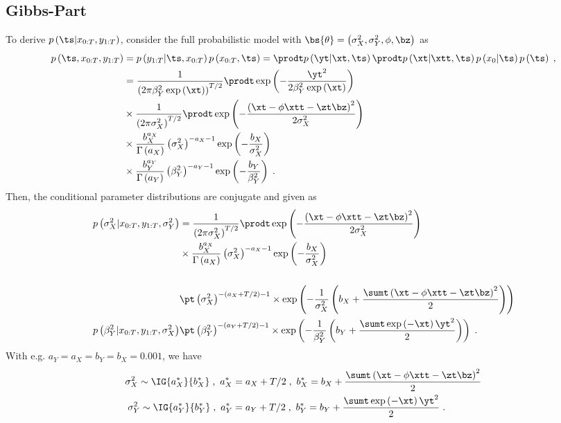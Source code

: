 \subsection{Gibbs-Part}
To derive $p\left(\ts|x_{0:T},y_{1:T}\right)$, consider the full probabilistic model with $\bs{\theta}=\left(\sigma_X^2,\sigma_Y^2,\phi,\bz\right)$ as
\begin{align*}
p\left(\ts,x_{0:T},y_{1:T}\right)
&=
p\left(y_{1:T}|\ts,x_{0:T}\right)p\left(x_{0:T},\ts\right)
=
\prodt p\left(\yt|\xt,\ts\right)
\prodt p\left(\xt|\xtt,\ts\right)p\left(x_0|\ts\right)p\left(\ts\right)\;,\\
&=
\frac{1}{\left(2\pi\beta_{Y}^2\exp\left(\xt\right)\right)^{T/2}}\prodt \exp \left(-\frac{\yt^2}{2\beta_{Y}^2\exp\left(\xt\right)}\right)\\
&\times
\frac{1}{\left(2\pi\sigma_{X}^2\right)^{T/2}}\prodt \exp \left(-\frac{\left(\xt-\phi\xtt-\zt\bz\right)^2}{2\sigma_X^2}\right)\\
&\times \frac{b_X^{a_X}}{\Gamma\left(a_X\right)}\left(\sigma_X^2\right)^{-a_X-1}\exp\left(-\frac{b_X}{\sigma_X^2}\right)\\
&\times \frac{b_Y^{a_Y}}{\Gamma\left(a_Y\right)}\left(\beta_Y^2\right)^{-a_Y-1}\exp\left(-\frac{b_Y}{\beta_Y^2}\right)\;.
\end{align*}
Then, the conditional parameter distributions are conjugate and given as
\begin{align*}
p\left(\sigma_X^2|x_{0:T},y_{1:T},\sigma_Y^2\right)
&=\frac{1}{\left(2\pi\sigma_{X}^2\right)^{T/2}}\prodt \exp \left(-\frac{\left(\xt-\phi\xtt-\zt\bz\right)^2}{2\sigma_X^2}\right)\\
&\times \frac{b_X^{a_X}}{\Gamma\left(a_X\right)}\left(\sigma_X^2\right)^{-a_X-1}\exp\left(-\frac{b_X}{\sigma_X^2}\right)\\
\\
&\pt \left(\sigma_X^2\right)^{-(a_X+T/2)-1}
\times\exp
\left(
-\frac{1}{\sigma_X^2}
\left(
b_X+\frac{\sumt\left(\xt-\phi\xtt-\zt\bz\right)^2}{2}
\right)
\right)\\
p\left(\beta_Y^2|x_{0:T},y_{1:T},\sigma_X^2\right)
&\pt
\left(\beta_Y^2\right)^{-(a_Y+T/2)-1} 
\times \exp
\left(
-\frac{1}{\beta_Y^2}
\left(
b_Y+\frac{\sumt\exp\left(-\xt\right)\yt^2}{2}
\right)
\right)\;.
\end{align*}
With e.g. $a_Y=a_X=b_Y=b_X=0.001$, we have
\begin{align*}
\sigma_X^2\sim\IG{a^*_X}{b^*_X}\;,~a^*_X&=a_X+T/2\;,~b^*_X=b_X+\frac{\sumt\left(\xt-\phi\xtt-\zt\bz\right)^2}{2}\\
\sigma_Y^2\sim\IG{a^*_Y}{b^*_Y}\;,~a^*_Y&=a_Y+T/2\;,~b^*_Y=b_Y+\frac{\sumt\exp\left(-\xt\right)\yt^2}{2}\;.
\end{align*}
